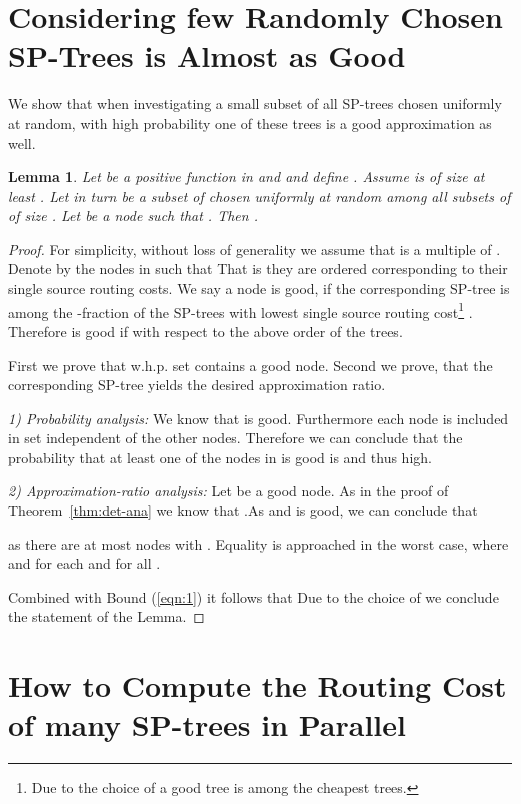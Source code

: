 \documentclass[11pt]{article}
\newtheorem{lemma}[theorem]{Lemma}
\begin{document}
\section{Considering few Randomly Chosen SP-Trees is Almost as Good}\label{sec:rand-ana}
We show that when investigating a small subset of all SP-trees chosen uniformly at random, with high probability one of these trees is a good approximation as well.
\begin{lemma}\label{lem:rand-ana}
Let  be a positive function in  and  and define . Assume  is of size at least . Let  in turn be a subset of  chosen uniformly at random among all subsets of  of size . Let  be a node such that . Then .   
\end{lemma}
\begin{proof}
For simplicity, without loss of generality we assume that  is a multiple of . Denote by  the nodes in  such that  That is they are ordered corresponding to their single source routing costs. We say a node  is good, if the corresponding SP-tree  is among the -fraction of the SP-trees with lowest single source routing cost\footnote{Due to the choice of  a good tree is among the  cheapest trees.} . Therefore  is good if  with respect to the above order of the trees.

First we prove that w.h.p. set  contains a good node. Second we prove, that the corresponding SP-tree yields the desired approximation ratio.

\emph{1) Probability analysis:} We know that  is good. Furthermore each node  is included in set  independent of the other nodes. Therefore we can conclude that the probability that at least one of the nodes  in  is good is  and thus high.


\emph{2) Approximation-ratio analysis:} Let  be a good node. 
As in the proof of Theorem~\ref{thm:det-ana} we know that 
.As  and  is good, we can conclude that 

as there are at most  nodes  with .
Equality is approached in the worst case, where  and  for each  and  for all . 

Combined with Bound (\ref{eqn:1}) it follows that 
 Due to the choice of  we conclude the statement of the Lemma.

\end{proof}


\section{How to Compute the Routing Cost of many SP-trees in Parallel}
\end{document}
